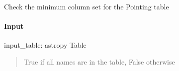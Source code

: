 \documentclass[letterpaper,10pt,english]{sphinxmanual}
\begin{document}
\begin{fulllineitems}
\label{\detokenize{api/pymusepipe:pymusepipe.util_image.check_column_set}}
\pysigstartsignatures
{}
\pysigstopsignatures
\sphinxAtStartPar
Check the minimum column set for the Pointing table


\paragraph{Input}
\label{\detokenize{api/pymusepipe:id140}}
\sphinxAtStartPar
input\_table: astropy Table
\begin{quote}\begin{description}
\sphinxAtStartPar
{}

\sphinxAtStartPar
True if all names are in the table, False otherwise

\end{description}\end{quote}

\end{fulllineitems}

\end{document}
